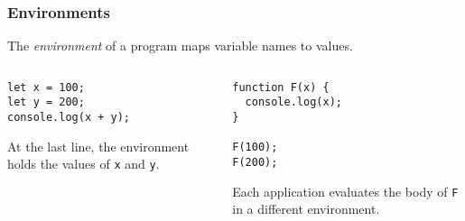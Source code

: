 \documentclass[8pt,pdf]{beamer}
\begin{document}
\begin{frame}[fragile]
\frametitle{Environments}

\begin{definition}
The \emph{environment} of a program maps variable names to values.
\end{definition}


\begin{columns}

\begin{column}{0.4\textwidth}
\begin{lstlisting}
let x = 100;
let y = 200;
console.log(x + y);
\end{lstlisting}
At the last line, the environment holds the values of
\lstinline|x| and \lstinline|y|.
\end{column}

\begin{column}{0.4\textwidth}
\begin{lstlisting}
function F(x) {
  console.log(x);
}

F(100);
F(200);
\end{lstlisting}
Each application evaluates the body of \lstinline|F| 
in a different environment.
\end{column}

\end{columns}

\end{frame}
\end{document}
